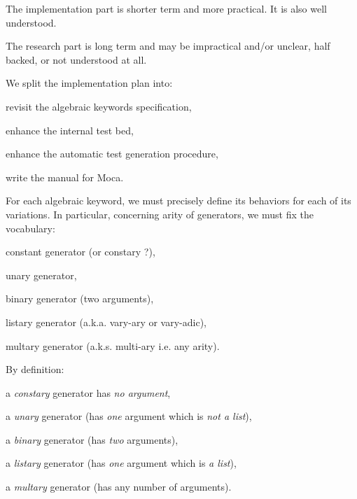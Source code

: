 The implementation part is shorter term and more practical. It is also well understood.

The research part is long term and may be impractical and/or unclear, half
backed, or not understood at all.



We split the implementation plan into:

\begin{citemize}
  \item revisit the algebraic keywords specification,
  \item enhance the internal test bed,
  \item enhance the automatic test generation procedure,
  \item write the manual for Moca.
\end{citemize}



For each algebraic keyword, we must precisely define its behaviors for each
of its variations. In particular, concerning arity of generators, we must fix
the vocabulary:

\begin{citemize}
  \item constant generator (or constary ?),
  \item unary generator,
  \item binary generator (two arguments),
  \item listary generator (a.k.a. vary-ary or vary-adic),
  \item multary generator (a.k.s. multi-ary i.e. any arity).
\end{citemize}



By definition:
\begin{citemize}
  \item a {\em constary} generator has {\em no argument},
  \item a {\em unary} generator (has {\em one} argument which is {\em not a list}),
  \item a {\em binary} generator (has {\em two} arguments),
  \item a {\em listary} generator (has {\em one} argument which is {\em a list}),
  \item a {\em multary} generator (has any number of arguments).
\end{citemize}

